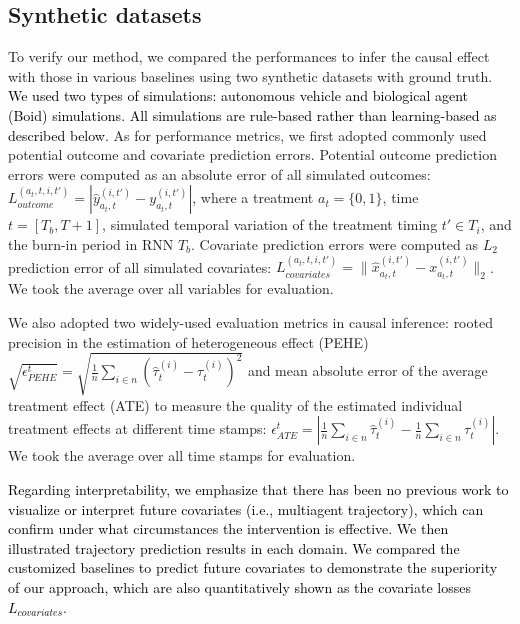 \documentclass[journal]{IEEEtran}
\newcommand{\eq}[1]{\begin{align}#1\end{align}}
\begin{document}
\subsection{Synthetic datasets}
\label{ssec:synthetic}
\vspace{-0pt}
To verify our method, we compared the performances to infer the causal effect with those in various baselines using two synthetic datasets with ground truth.
\textcolor{black}{We used two types of simulations: autonomous vehicle and biological agent (Boid) simulations. All simulations are rule-based rather than learning-based as described below.}
As for performance metrics, we first adopted commonly used potential outcome and covariate prediction errors.
Potential outcome prediction errors were computed as an absolute error of all simulated outcomes: $L_{outcome}^{(a_t,t,i,t')} = |\hat{y}_{a_t,t}^{(i,t')} - y_{a_t,t}^{(i,t')} |$, where a treatment $a_t = \{0,1\}$, time $t = [T_b,T+1]$, simulated temporal variation of the treatment timing $t' \in T_i$, and the burn-in period in RNN $T_b$.
Covariate prediction errors were computed as $L_2$ prediction error of all simulated covariates: $L_{covariates}^{(a_t,t,i,t')} = \|\hat{x}_{a_t,t}^{(i,t')} - x_{a_t,t}^{(i,t')} \|_2$.
We took the average over all variables for evaluation.

We also adopted two widely-used evaluation metrics in causal inference: rooted precision in the estimation of heterogeneous effect (PEHE) \cite{hill2011bayesian} 
$\sqrt{\epsilon^t_{PEHE}}=\sqrt{\frac{1}{n}\sum_{i\in n}(\hat{\tau}_t^{(i)}-\tau_t^{(i)})^2}$
and mean absolute error of the average treatment effect (ATE) \cite{willmott2005advantages} to measure the quality of the estimated individual treatment effects at different time stamps: $\epsilon^t_{ATE}=|\frac{1}{n}\sum_{i\in n}\hat{\tau}_t^{(i)}-\frac{1}{n}\sum_{i\in n}\tau_t^{(i)}|$.
We took the average over all time stamps for evaluation.

\textcolor{black}{Regarding interpretability, we emphasize that there has been no previous work to visualize or interpret future covariates (i.e., multiagent trajectory), which can confirm under what circumstances the intervention is effective. 
We then illustrated trajectory prediction results in each domain.
We compared the customized baselines to predict future covariates to demonstrate the superiority of our approach, which are also quantitatively shown as the covariate losses $L_{covariates}$. }
\end{document}
